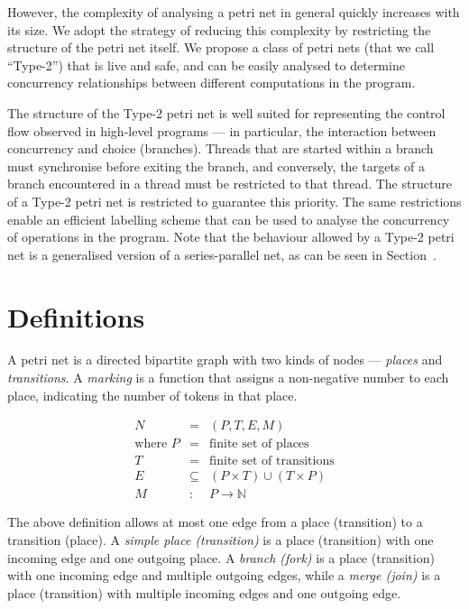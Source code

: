 \documentclass[12pt,a4paper]{article}
\begin{document}
However, the complexity of analysing a petri net in general quickly
increases with its size. We adopt the strategy of reducing this
complexity by restricting the structure of the petri net itself. We
propose a class of petri nets (that we call ``Type-2'') that is live
and safe, and can be easily analysed to determine concurrency
relationships between different computations in the program.

The structure of the Type-2 petri net is well suited for representing
the control flow observed in high-level programs --- in particular,
the interaction between concurrency and choice (branches). Threads
that are started within a branch must synchronise before exiting the
branch, and conversely, the targets of a branch encountered in a
thread must be restricted to that thread. The structure of a Type-2
petri net is restricted to guarantee this priority. The same
restrictions enable an efficient labelling scheme that can be used to
analyse the concurrency of operations in the program. Note that the
behaviour allowed by a Type-2 petri net is a generalised version of a
series-parallel net\cite{something}, as can be seen in
Section~\cite{sec:somewhere}.

\section{Definitions}
\label{sec:defintions}

A petri net is a directed bipartite graph with two kinds of nodes ---
\textit{places} and \textit{transitions}. A \textit{marking} is a
function that assigns a non-negative number to each place, indicating
the number of tokens in that place.

\begin{eqnarray*}
  N & = & (P, T, E, M)\\
  \textrm{where } P & = & \textrm{finite set of places}\\
  T & = & \textrm{finite set of transitions}\\
  E & \subseteq & (P \times T) \cup (T \times P)\\
  M & : & P \rightarrow \mathbb{N}
\end{eqnarray*}

The above definition allows at most one edge from a place (transition)
to a transition (place). A \textit{simple place (transition)} is a
place (transition) with one incoming edge and one outgoing place. A
\textit{branch (fork)} is a place (transition) with one incoming edge
and multiple outgoing edges, while a \textit{merge (join)} is a place
(transition) with multiple incoming edges and one outgoing edge. 
\end{document}
